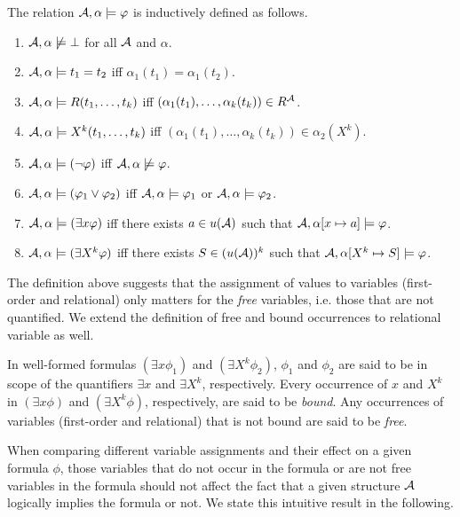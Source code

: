 \documentclass[11pt,twoside=off,numbers=noenddot]{scrbook}
\begin{document}
\begin{definition}
  The relation $\mathcal{A}, \alpha \models \varphi$ is inductively defined as follows.
  \begin{enumerate}
    \item $\mathcal{A}, \alpha \not\models \bot$ for all $\mathcal{A}$ and $\alpha$.
    \item $\mathcal{A}, \alpha \models t_1 = t_2$ iff $\alpha_1(t_1) = \alpha_1(t_2)$.
    \item $\mathcal{A}, \alpha \models R(t_1, \dots, t_k)$ iff $(\alpha_1(t_1), \dots, \alpha_k(t_k)) \in R^{\mathcal{A}}$.
    \item $\mathcal{A}, \alpha \models X^k(t_1, \dots, t_k)$ iff $(\alpha_1(t_1), \dots, \alpha_k(t_k)) \in \alpha_2(X^k)$.
    \item $\mathcal{A}, \alpha \models (\neg \varphi)$ iff $\mathcal{A}, \alpha \not\models \varphi$.
    \item $\mathcal{A}, \alpha \models (\varphi_1 \vee \varphi_2)$ iff $\mathcal{A}, \alpha \models \varphi_1$ or $\mathcal{A}, \alpha \models \varphi_2$.
    \item $\mathcal{A}, \alpha \models (\exists x \varphi)$ iff there exists $a \in u(\mathcal{A})$ such that $\mathcal{A}, \alpha[x \mapsto a] \models \varphi$.
    \item $\mathcal{A}, \alpha \models (\exists X^k \varphi)$ iff there exists $S \in (u(\mathcal{A}))^k$ such that $\mathcal{A}, \alpha[X^k \mapsto S] \models \varphi$.
  \end{enumerate}
\end{definition}

The definition above suggests that the assignment of values to variables (first-order and relational) only matters for the \emph{free} variables, i.e. those that are not quantified. We extend the definition of free and bound occurrences to relational variable as well.

\begin{definition}
  In well-formed formulas $(\exists x \phi_1)$ and $(\exists X^k \phi_2)$, $\phi_1$ and $\phi_2$ are said to be in scope of the quantifiers $\exists x$ and $\exists X^k$, respectively. Every occurrence of $x$ and $X^k$ in $(\exists x \phi)$ and $(\exists X^k \phi)$, respectively, are said to be \emph{bound}. Any occurrences of variables (first-order and relational) that is not bound are said to be \emph{free}.
\end{definition}

When comparing different variable assignments and their effect on a given formula $\phi$, those variables that do not occur in the formula or are not free variables in the formula should not affect the fact that a given structure $\mathcal{A}$ logically implies the formula or not. We state this intuitive result in the following.
\end{document}
